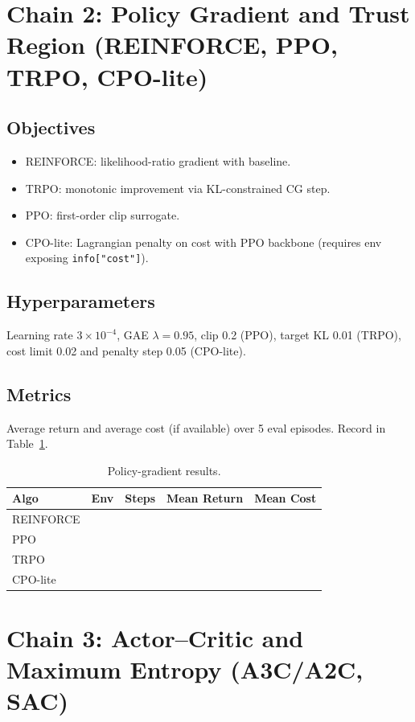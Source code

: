 \documentclass[11pt]{article}
\newcommand{\code}[1]{\texttt{#1}}
\begin{document}
\section{Chain 2: Policy Gradient and Trust Region (REINFORCE, PPO, TRPO, CPO-lite)}
\subsection{Objectives}
\begin{itemize}[leftmargin=*]
    \item REINFORCE: likelihood-ratio gradient with baseline.
    \item TRPO: monotonic improvement via KL-constrained CG step.
    \item PPO: first-order clip surrogate.
    \item CPO-lite: Lagrangian penalty on cost with PPO backbone (requires env exposing \code{info["cost"]}).
\end{itemize}

\subsection{Hyperparameters}
Learning rate $3\times10^{-4}$, GAE $\lambda=0.95$, clip 0.2 (PPO), target KL 0.01 (TRPO), cost limit 0.02 and penalty step 0.05 (CPO-lite).

\subsection{Metrics}
Average return and average cost (if available) over 5 eval episodes. Record in Table~\ref{tab:policyresults}.

\begin{table}[h]
\centering
\caption{Policy-gradient results.}
\label{tab:policyresults}
\begin{tabular}{lcccc}
\toprule
Algo & Env & Steps & Mean Return & Mean Cost \\
\midrule
REINFORCE & & & & \\
PPO & & & & \\
TRPO & & & & \\
CPO-lite & & & & \\
\bottomrule
\end{tabular}
\end{table}

\section{Chain 3: Actor--Critic and Maximum Entropy (A3C/A2C, SAC)}
\end{document}

